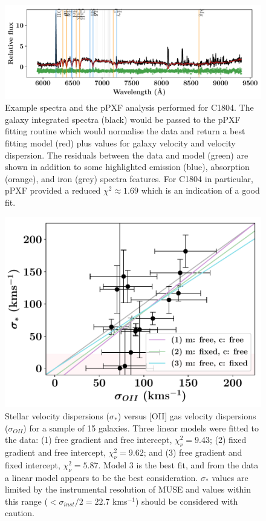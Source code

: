 \documentclass[12pt, twocolumn]{revtex4-1}    %
\begin{document}
\begin{figure}
\includegraphics[width=\textwidth]{data/cube_1804_spectra_complete}
\caption{Example spectra and the pPXF analysis performed for C1804. The galaxy integrated spectra (black) would be passed to the pPXF fitting routine which would normalise the data and return a best fitting model (red) plus values for galaxy velocity and velocity dispersion. The residuals between the data and model (green) are shown in addition to some highlighted emission (blue), absorption (orange), and iron (grey) spectra features. For C1804 in particular, pPXF provided a reduced $\chi^2 \approx 1.69$ which is an indication of a good fit.}
\label{fig:ppxf_spectra}
\end{figure}


\begin{figure}
\includegraphics[width=1.0\linewidth]{data/sigma_star_vs_sigma_oii}
\caption{Stellar velocity dispersions ($\sigma_*$) versus [OII] gas velocity dispersions ($\sigma_{OII}$) for a sample of 15 galaxies. Three linear models were fitted to the data: (1) free gradient and free intercept, $\chi^2_{\nu}=9.43$; (2) fixed gradient and free intercept, $\chi^2_\nu=9.62$; and (3) free gradient and fixed intercept, $\chi^2_\nu=5.87$. Model 3 is the best fit, and from the data a linear model appears to be the best consideration. $\sigma_*$ values are limited by the instrumental resolution of MUSE and values within this range ($<\sigma_{inst}/2=22.7$ kms$^{-1}$) should be considered with caution.  }
\label{fig:velocity_dispersions}
\end{figure}
\end{document}
